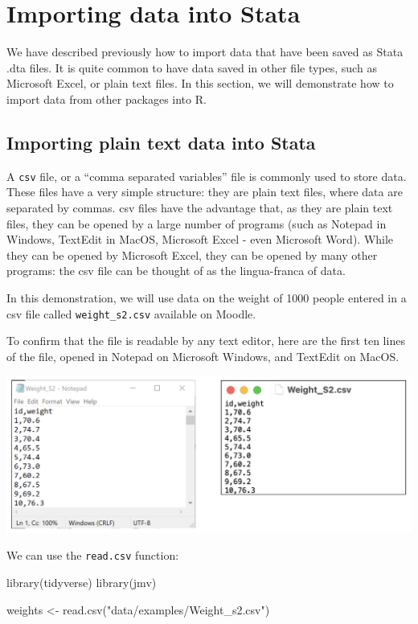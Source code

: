 \documentclass[
]{memoir}
\newenvironment{Shaded}{\begin{snugshade}}{\end{snugshade}}
\newcommand{\FunctionTok}[1]{\textcolor[rgb]{0.00,0.00,0.00}{#1}}
\newcommand{\NormalTok}[1]{#1}
\newcommand{\OtherTok}[1]{\textcolor[rgb]{0.56,0.35,0.01}{#1}}
\newcommand{\StringTok}[1]{\textcolor[rgb]{0.31,0.60,0.02}{#1}}
\begin{document}
\hypertarget{importing-data-into-stata}{%
\section{Importing data into Stata}\label{importing-data-into-stata}}

We have described previously how to import data that have been saved as Stata .dta files. It is quite common to have data saved in other file types, such as Microsoft Excel, or plain text files. In this section, we will demonstrate how to import data from other packages into R.

\hypertarget{importing-plain-text-data-into-stata}{%
\subsection{Importing plain text data into Stata}\label{importing-plain-text-data-into-stata}}

A \texttt{csv} file, or a ``comma separated variables'' file is commonly used to store data. These files have a very simple structure: they are plain text files, where data are separated by commas. csv files have the advantage that, as they are plain text files, they can be opened by a large number of programs (such as Notepad in Windows, TextEdit in MacOS, Microsoft Excel - even Microsoft Word). While they can be opened by Microsoft Excel, they can be opened by many other programs: the csv file can be thought of as the lingua-franca of data.

In this demonstration, we will use data on the weight of 1000 people entered in a csv file called \texttt{weight\_s2.csv} available on Moodle.

To confirm that the file is readable by any text editor, here are the first ten lines of the file, opened in Notepad on Microsoft Windows, and TextEdit on MacOS.

\includegraphics[width=0.66\linewidth]{img/mod02/import-01}

We can use the \texttt{read.csv} function:

\begin{Shaded}
\begin{Highlighting}[]
\FunctionTok{library}\NormalTok{(tidyverse)}
\FunctionTok{library}\NormalTok{(jmv)}

\NormalTok{weights }\OtherTok{\textless{}{-}} \FunctionTok{read.csv}\NormalTok{(}\StringTok{"data/examples/Weight\_s2.csv"}\NormalTok{)}
\end{Highlighting}
\end{Shaded}
\end{document}
